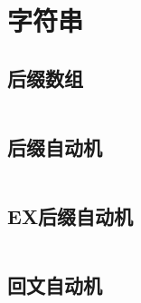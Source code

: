 \chapter{字符串}
\section{后缀数组}
\inputminted{cpp}{\source/string/suffix-array.cpp}
\section{后缀自动机}
\inputminted{cpp}{\source/string/suffix-automaton.cpp}
\section{EX后缀自动机}
\inputminted{cpp}{\source/string/ex-suffix-automaton.cpp}
\section{回文自动机}
\inputminted{cpp}{\source/string/palindromic-tree.cpp}
